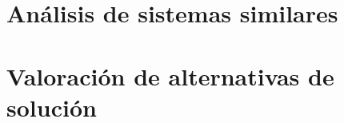 \section{Análisis de sistemas similares}



\newpage
\section{Valoración de alternativas de solución}
